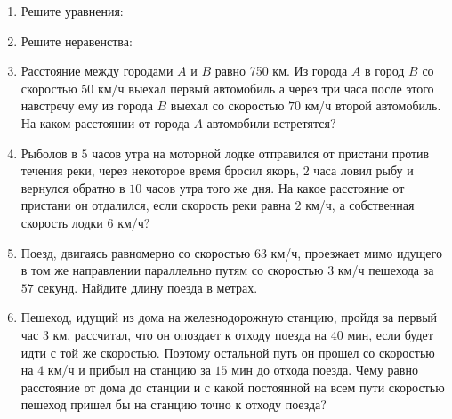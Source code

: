 \documentclass[12pt, a4paper]{article}
\begin{document}
   \cfoot{}
\begin{enumerate}[label=\textbf{\arabic*.}]
	\item Решите уравнения:
	\begin{enumerate}[label=\asbuk*)]
	\end{enumerate}
	\item Решите неравенства: 
	\begin{enumerate}[label=\asbuk*)]
	\end{enumerate}
	\item Расстояние между городами $A$ и $B$ равно 750 км. Из города $A$ в город $B$ со скоростью $50$ км/ч выехал первый автомобиль а через три часа после этого навстречу ему из города $B$ выехал со скоростью $70$ км/ч второй автомобиль. На каком расстоянии от города $A$ автомобили встретятся?
	\item Рыболов в $5$ часов утра на моторной лодке отправился от пристани против течения реки, через некоторое время бросил якорь, $2$ часа ловил рыбу и вернулся обратно в $10$ часов утра того же дня. На какое расстояние от пристани он отдалился, если скорость реки равна $2$ км/ч, а собственная скорость лодки $6$	 км/ч?
	\item Поезд, двигаясь равномерно со скоростью $63$ км/ч, проезжает мимо идущего в том же направлении параллельно путям со скоростью $3$ км/ч пешехода за $57$ секунд. Найдите длину поезда в метрах.
	\item Пешеход, идущий из дома на железнодорожную станцию, пройдя за первый час $3$ км, рассчитал, что он опоздает к отходу поезда на $40$ мин, если будет идти с той же скоростью. Поэтому остальной путь он прошел со скоростью на $4$ км/ч и прибыл на станцию за $15$ мин до отхода поезда. Чему равно расстояние от дома до станции и с какой постоянной на всем пути скоростью пешеход пришел бы на станцию точно к отходу поезда?
\end{enumerate}
\end{document}
